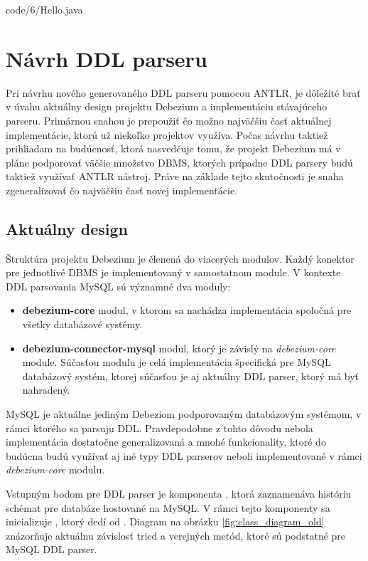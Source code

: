 \begin{minipage}{\linewidth}

            {code/6/Hello.java}
\end{minipage}

\section{Návrh DDL parseru}
Pri návrhu nového generovaného DDL parseru pomocou ANTLR, je dôležité brať v úvahu aktuálny design projektu Debezium a implementáciu stávajúceho parseru. Primárnou snahou je prepoužiť čo možno najväčšiu časť aktuálnej implementácie, ktorú už niekoľko projektov využíva. Počas návrhu taktiež prihliadam na budúcnosť, ktorá nasvedčuje tomu, že projekt Debezium má v pláne podporovať väčšie množstvo DBMS, ktorých prípadne DDL parsery budú taktiež využívať ANTLR nástroj. Práve na základe tejto skutočnosti je snaha zgeneralizovať čo najväčšiu časť novej implementácie.

\subsection{Aktuálny design}\label{old_design}
Štruktúra projektu Debezium je členená do viacerých modulov. Každý konektor pre jednotlivé DBMS je implementovaný v samostatnom module. V kontexte DDL parsovania MySQL sú významné dva moduly:
\begin{itemize}
\item \textbf{debezium-core} modul, v ktorom sa nachádza implementácia spoločná pre všetky databázové systémy.
\item \textbf{debezium-connector-mysql} modul, ktorý je závislý na \textit{debezium-core} module. Súčasťou modulu je celá implementácia špecifická pre MySQL databázový systém, ktorej súčasťou je aj aktuálny DDL parser, ktorý má byť nahradený.
\end{itemize}

MySQL je aktuálne jediným Debeziom podporovaným databázovým systémom, v rámci ktorého sa parsuju DDL. Pravdepodobne z tohto dôvodu nebola implementácia dostatočne generalizovaná a mnohé funkcionality, ktoré do budúcna budú využívať aj iné typy DDL parserov neboli implementované v rámci \textit{debezium-core} modulu.

Vstupným bodom pre DDL parser je komponenta , ktorá zaznamenáva históriu schémat pre databáze hostované na MySQL. V rámci tejto komponenty sa inicializuje , ktorý dedí od . Diagram na obrázku \ref{fig:class_diagram_old} znázorňuje aktuálnu závislosť tried a verejných metód, ktoré sú podstatné pre MySQL DDL parser.

